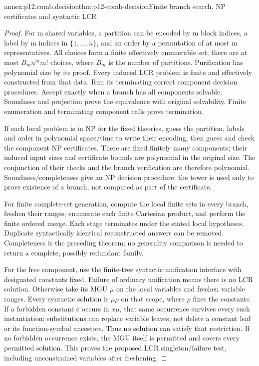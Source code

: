\begin{annexitem}{annex:p12.comb.decision}{thm:p12-comb-decision}{Finite branch search, NP certificates and syntactic LCR}
\begin{proof}
For m shared variables, a partition can be encoded by m block indices,
a label by m indices in \(\{1,\ldots,n\}\), and an order by a
permutation of at most m representatives. All choices form a finite
effectively enumerable set; there are at most
\(B_m n^m m!\) choices, where \(B_m\) is the number of partitions.
Purification has polynomial size by its proof. Every induced LCR
problem is finite and effectively constructed from that data.
Run its terminating correct component decision procedures. Accept
exactly when a branch has all components solvable. Soundness and
projection prove the equivalence with original solvability. Finite
enumeration and terminating component calls prove termination.

If each local problem is in NP for the fixed theories, guess the
partition, labels and order in polynomial space/time to write their
encoding, then guess and check the component NP certificates.
There are fixed finitely many components; their induced input
sizes and certificate bounds are polynomial in the original size.
The conjunction of their checks and the branch verification are
therefore polynomial. Soundness/completeness give an NP decision
procedure; the tower is used only to prove existence of a branch,
not computed as part of the certificate.

For finite complete-set generation, compute the local finite sets
in every branch, freshen their ranges, enumerate each finite
Cartesian product, and perform the finite ordered merge. Each
stage terminates under the stated local hypotheses. Duplicate
syntactically identical reconstructed answers can be removed.
Completeness is the preceding theorem; no generality comparison
is needed to return a complete, possibly redundant family.

For the free component, use the finite-tree syntactic unification
interface with designated constants fixed. Failure of ordinary
unification means there is no LCR solution. Otherwise take its
MGU \(\mu\) on the local variables and freshen variable ranges.
Every syntactic solution is \(\mu\rho\) on that scope, where
\(\rho\) fixes the constants. If a forbidden constant c occurs
in \(x\mu\), that same occurrence survives every such
instantiation: substitutions can replace variable leaves, not
delete a constant leaf or its function-symbol ancestors. Thus
no solution can satisfy that restriction. If no forbidden
occurrence exists, the MGU itself is permitted and covers every
permitted solution. This proves the proposed LCR singleton/failure
test, including unconstrained variables after freshening.


\end{proof}
\end{annexitem}
